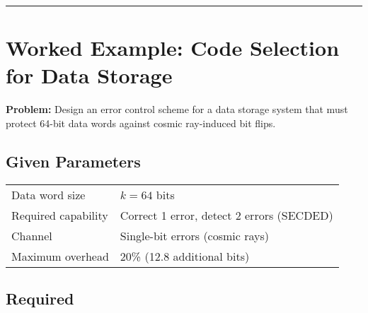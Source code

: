 \begin{Shaded}
\begin{Highlighting}[]
\OperatorTok{=}
\NormalTok{(}\SpecialCharTok{\{}\SpecialCharTok{\}}\NormalTok{)  }

\OperatorTok{=}\OperatorTok{{-}} \NormalTok{) }\OperatorTok{//} 
\OperatorTok{=}\OperatorTok{{-}} 
\NormalTok{(}\SpecialCharTok{\{}\SpecialCharTok{\}}\SpecialCharTok{\{}\SpecialCharTok{\}}\NormalTok{)}
\end{Highlighting}
\end{Shaded}

\begin{center}\rule{0.5\linewidth}{0.5pt}\end{center}

\section{Worked Example: Code Selection for Data Storage}

\textbf{Problem:} Design an error control scheme for a data storage system that must protect 64-bit data words against cosmic ray-induced bit flips.

\subsection*{Given Parameters}

\begin{tabular}{@{}ll@{}}
Data word size & $k = 64$ bits \\
Required capability & Correct 1 error, detect 2 errors (SECDED) \\
Channel & Single-bit errors (cosmic rays) \\
Maximum overhead & 20\% (12.8 additional bits) \\
\end{tabular}

\subsection*{Required}

